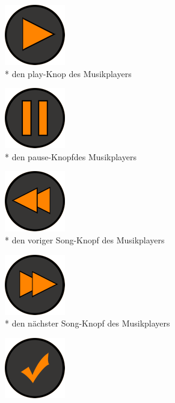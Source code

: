 \documentclass[FIPLY_base.tex]{subfiles}
\begin{document}
	\begin{figure}[H]
		\begin{subfigure}[b]{0.2\textwidth}
			\includegraphics[scale=0.5]{img/icons/play}
			\caption{* den play-Knop des Musikplayers}
		\end{subfigure}
		\hfil
		\begin{subfigure}[b]{0.2\textwidth}
			\includegraphics[scale=0.5]{img/icons/pause}
			\caption{* den pause-Knopfdes Musikplayers}
		\end{subfigure}
		\hfil
		\begin{subfigure}[b]{0.2\textwidth}
			\includegraphics[scale=0.5]{img/icons/last}
			\caption{* den voriger Song-Knopf des Musikplayers}
		\end{subfigure}
		\hfil
		\begin{subfigure}[b]{0.2\textwidth}
			\includegraphics[scale=0.5]{img/icons/next}
			\caption{* den nächster Song-Knopf des Musikplayers}
		\end{subfigure}
		\hfil
		\begin{subfigure}[b]{0.2\textwidth}
			\includegraphics[scale=0.5]{img/icons/successsmall}

\end{subfigure}
\end{figure}
\end{document}
